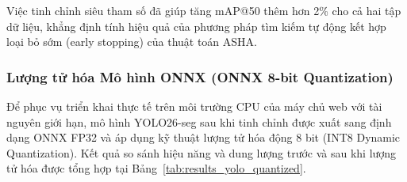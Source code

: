 \begin{table}[H]
  \centering
  \caption{Kết quả của YOLO26-seg trước và sau khi tinh chỉnh bằng RayTune}
  \label{tab:results_yolo_tuned}
\end{table}

Việc tinh chỉnh siêu tham số đã giúp tăng mAP@50 thêm hơn 2\% cho cả hai tập dữ liệu, khẳng định tính hiệu quả của phương pháp tìm kiếm tự động kết hợp loại bỏ sớm (early stopping) của thuật toán ASHA.

\subsubsection{Lượng tử hóa Mô hình ONNX (ONNX 8-bit Quantization)}
Để phục vụ triển khai thực tế trên môi trường CPU của máy chủ web với tài nguyên giới hạn, mô hình YOLO26-seg sau khi tinh chỉnh được xuất sang định dạng ONNX FP32 và áp dụng kỹ thuật lượng tử hóa động 8 bit (INT8 Dynamic Quantization). Kết quả so sánh hiệu năng và dung lượng trước và sau khi lượng tử hóa được tổng hợp tại Bảng~\ref{tab:results_yolo_quantized}.

